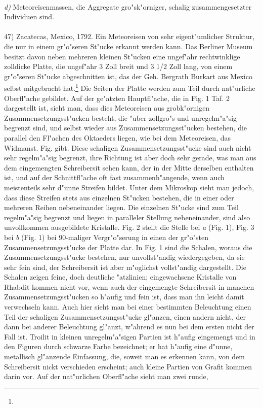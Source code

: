 \documentclass[a4paper, 11pt, oneside]{article}
\begin{document}
\paragraph{}
\emph{d)} Meteoreisenmassen, die Aggregate gro"sk"orniger, schalig zusammengesetzter Individuen sind.
\vspace{\medskipamount}
\paragraph{}
47) Zacatecas, Mexico, 1792. Ein Meteoreisen von sehr eigent"umlicher Struktur, die nur in einem gr"o"seren St"ucke erkannt werden kann. Das Berliner Museum besitzt davon neben mehreren kleinen St"ucken eine ungef"ahr rechtwinklige zolldicke Platte, die ungef"ahr 3 Zoll breit und 3 1/2 Zoll lang, von einem gr"o"seren St"ucke abgeschnitten ist, das der Geh. Bergrath Burkart aus Mexico selbst mitgebracht hat.\footnote{} Die Seiten der Platte werden zum Teil durch nat"urliche Oberfl"ache gebildet. Auf der ge"atzten Hauptfl"ache, die in Fig. 1 Taf. 2 dargestellt ist, sieht man, dass dies Meteoreisen aus grobk"ornigen Zusammensetzungsst"ucken besteht, die "uber zollgro"s und unregelm"a"sig begrenzt sind, und selbst wieder aus Zusammensetzungsst"ucken bestehen, die parallel den Fl"achen des Oktaeders liegen, wie bei dem Meteoreisen, das Widmanst. Fig. gibt. Diese schaligen Zusammensetzungsst"ucke sind auch nicht sehr regelm"a"sig begrenzt, ihre Richtung ist aber doch sehr gerade, was man aus dem eingemengten Schreibersit sehen kann, der in der Mitte derselben enthalten ist, und auf der Schnittfl"ache oft fast zusammenh"angende, wenn auch meistenteils sehr d"unne Streifen bildet. Unter dem Mikroskop sieht man jedoch, dass diese Streifen stets aus einzelnen St"ucken bestehen, die in einer oder mehreren Reihen nebeneinander liegen. Die einzelnen St"ucke sind zum Teil regelm"a"sig begrenzt und liegen in paralleler Stellung nebeneinander, sind also unvollkommen ausgebildete Kristalle. Fig. 2 stellt die Stelle bei \emph{a} (Fig. 1), Fig. 3 bei \emph{b} (Fig. 1) bei 90-maliger Vergr"o"serung in einen der gr"o"sten Zusammensetzungsst"ucke der Platte dar. In Fig. 1 sind die Schalen, woraus die Zusammensetzungsst"ucke bestehen, nur unvollst"andig wiedergegeben, da sie sehr fein sind, der Schreibersit ist aber m"oglichst vollst"andig dargestellt. Die Schalen zeigen feine, doch deutliche "atzlinien; eingewachsene Kristalle von Rhabdit kommen nicht vor, wenn auch der eingemengte Schreibersit in manchen Zusammensetzungsst"ucken so h"aufig und fein ist, dass man ihn leicht damit verwechseln kann. Auch hier sieht man bei einer bestimmten Beleuchtung einen Teil der schaligen Zusammensetzungsst"ucke gl"anzen, einen andern nicht, der dann bei anderer Beleuchtung gl"anzt, w"ahrend es nun bei dem ersten nicht der Fall ist. Troilit in kleinen unregelm"a"sigen Partien ist h"aufig eingemengt und in den Figuren durch schwarze Farbe bezeichnet; er hat h"aufig eine d"unne, metallisch gl"anzende Einfassung, die, soweit man es erkennen kann, von dem Schreibersit nickt verschieden erscheint; auch kleine Partien von Grafit kommen darin vor. Auf der nat"urlichen Oberfl"ache sieht man zwei runde, 
\end{document}
